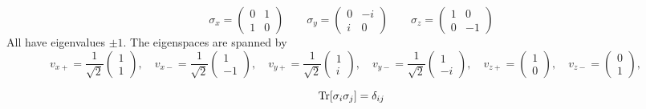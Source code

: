 \[ \sigma_x = \begin{pmatrix}
0 & 1 \\ 1 & 0
\end{pmatrix} \qquad \sigma_y = \begin{pmatrix}
0 & -i \\ i & 0
\end{pmatrix} \qquad \sigma_z = \begin{pmatrix}
1 & 0 \\ 0 & -1
\end{pmatrix} \]
All have eigenvalues $\pm 1$. The eigenspaces are spanned by
\[ v_{x+} = \frac{1}{\sqrt{2}}\begin{pmatrix}
1 \\ 1
\end{pmatrix}, \quad v_{x-} = \frac{1}{\sqrt{2}}\begin{pmatrix}
1 \\ -1
\end{pmatrix}, \quad v_{y+} = \frac{1}{\sqrt{2}}\begin{pmatrix}
1 \\ i
\end{pmatrix}, \quad v_{y-} = \frac{1}{\sqrt{2}}\begin{pmatrix}
1 \\ -i
\end{pmatrix}, \quad v_{z+} = \begin{pmatrix}
1 \\ 0
\end{pmatrix}, \quad v_{z-} = \begin{pmatrix}
0 \\ 1
\end{pmatrix}, \quad  \]

\[ \operatorname{Tr}[\sigma_i \sigma_j] = \delta_{ij} \]

